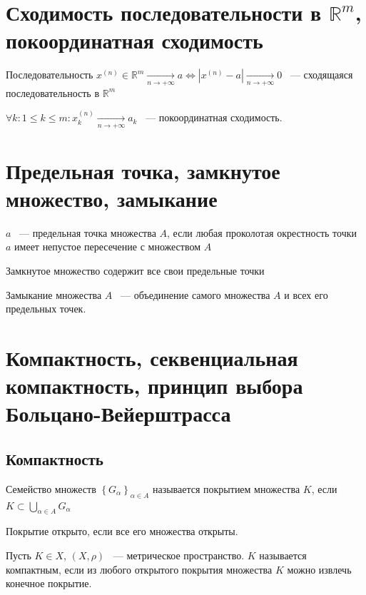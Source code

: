 \documentclass{article}
\begin{document}
    \newpage
    
    \section{Сходимость последовательности в $\mathbb{R}^m$, покоординатная сходимость}
    
        Последовательность $x^{(n)} \in \mathbb{R}^m \xrightarrow[n \rightarrow +\infty]{} a \Longleftrightarrow | x^{(n)} - a | \xrightarrow[n \rightarrow +\infty]{} 0$ ~--- сходящаяся последовательность в $\mathbb{R}^m$
        
        $\forall k : 1 \leq k \leq m : x^{(n)}_k \xrightarrow[n \rightarrow +\infty]{} a_k$ ~--- покоординатная сходимость.
        
    \newpage
    
    \section{Предельная точка, замкнутое множество, замыкание}
    
        $a$ ~--- предельная точка множества $A$, если любая проколотая окрестность точки $a$ имеет непустое пересечение с множеством $A$
        
        Замкнутое множество содержит все свои предельные точки
        
        Замыкание множества $A$ ~--- объединение самого множества $A$ и всех его предельных точек.
        
    \newpage
    
    \section{Компактность, секвенциальная компактность, принцип выбора Больцано-Вейерштрасса}
    
        \subsection{Компактность}
            
            Семейство множеств $\left\{ G_{\alpha} \right\}_{\alpha \in A}$ называется покрытием множества $K$, если $K \subset \bigcup\limits_{\alpha \in A} G_{\alpha}$
        
            Покрытие открыто, если все его множества открыты.
        
            Пусть $K \in X$, $(X, \rho)$ ~--- метрическое пространство. $K$ называется компактным, если из любого открытого покрытия множества $K$ можно извлечь конечное покрытие. 
        
\end{document}
